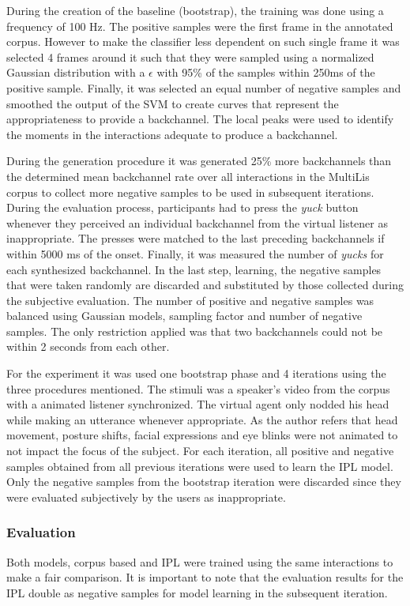 During the creation of the baseline (bootstrap), the training was done using a frequency of 100 Hz. The positive samples were the first frame in the annotated corpus. However to make the classifier less dependent on such single frame it was selected 4 frames around it such that they were sampled using a normalized Gaussian distribution with a $\epsilon$ with 95\% of the samples within 250ms of the positive sample. Finally, it was selected an equal number of negative samples and smoothed the output of the \ac{SVM} to create curves that represent the appropriateness to provide a backchannel. The local peaks were used to identify the moments in the interactions adequate to produce a backchannel.

During the generation procedure it was generated 25\% more backchannels than the determined mean backchannel rate over all interactions in the MultiLis corpus to collect more negative samples to be used in subsequent iterations. During the evaluation process, participants had to press the \textit{yuck} button whenever they perceived an individual backchannel from the virtual listener as inappropriate. The presses were matched to the last preceding backchannels if within 5000 ms of the onset. Finally, it was measured the number of \textit{yucks} for each synthesized backchannel. In the last step, learning, the negative samples that were taken randomly are discarded and substituted by those collected during the subjective evaluation. The number of positive and negative samples was balanced using Gaussian models, sampling factor and number of negative samples. The only restriction applied was that two backchannels could not be within 2 seconds from each other.

For the experiment it was used one bootstrap phase and 4 iterations using the three procedures mentioned. The stimuli was a speaker’s video from the corpus with a animated listener synchronized. The virtual agent only nodded his head while making an utterance whenever appropriate. As the author refers that head movement, posture shifts, facial expressions and eye blinks were not animated to not impact the focus of the subject. For each iteration, all positive and negative samples obtained from all previous iterations were used to learn the IPL model. Only the negative samples from the bootstrap iteration were discarded since they were evaluated subjectively by the users as inappropriate.

\subsubsection*{Evaluation}
Both models, corpus based and \ac{IPL} were trained using the same interactions to make a fair comparison. It is important to note that the evaluation results for the IPL double as negative samples for model learning in the subsequent iteration.

